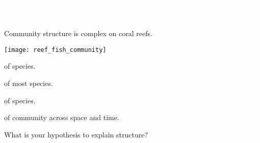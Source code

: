 \documentclass[t,handout]{beamer}  %
\begin{document}
{
\begin{frame}[b]{\textcolor{white}{Community structure.}}
\tiny\textcolor{white}{Elphine Stone Reef, Red Sea, Egypt. Derek Keats, Flickr, Creative Commons.}
\end{frame}
}


\begin{frame}[t]{Community structure is complex on coral reefs.}

\begin{multicols}{2}
	{\centering
	\texttt{[image: reef\_fish\_community]}\par}
\columnbreak
	
	\hangpara{} of species.
	
	\hangpara{} of most species.
	
	\hangpara{} of species.
	
	\hangpara{}
	
	\hangpara{} of community across space and time.
	
	\hangpara What is your hypothesis to explain structure?
\end{multicols}

\end{frame}

{
\begin{frame}[b]{}
\end{frame}
}
\end{document}
